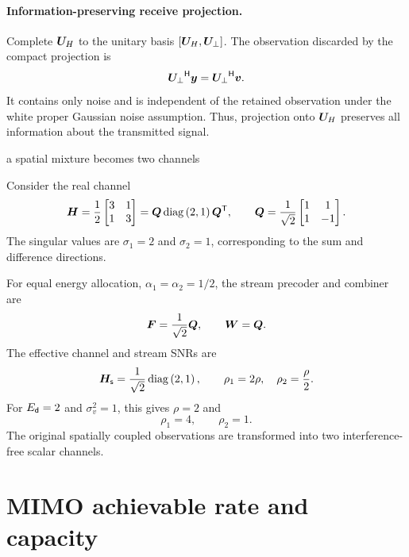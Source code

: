 \paragraph{Information-preserving receive projection.}
Complete $\bm{U}_{H}$ to the unitary basis
$[\bm{U}_{H},\bm{U}_{\perp}]$.
The observation discarded by the compact projection is
\begin{equation*}
	{\bm{U}_{\perp}}^{\mathsf{H}}\bm{y}
	={\bm{U}_{\perp}}^{\mathsf{H}}\bm{v}.
\end{equation*}
It contains only noise and is independent of the
retained observation under the white proper
Gaussian noise assumption. Thus, projection onto
$\bm{U}_{H}$ preserves all information about
the transmitted signal.

\begin{example}{a spatial mixture becomes two channels}
	\label{ex:svd}
	
	Consider the real channel
	\begin{equation*}
		\bm{H}
		=\frac{1}{2}
		\begin{bmatrix}
			3&1\\
			1&3
		\end{bmatrix}
		=\bm{Q}\operatorname{diag}\left(2,1\right){\bm{Q}}^{\mathsf{T}},
		\qquad
		\bm{Q}
		=\frac{1}{\sqrt{2}}
		\begin{bmatrix}
			1&1\\
			1&-1
		\end{bmatrix}.
	\end{equation*}
	The singular values are $\sigma_1=2$ and
	$\sigma_2=1$, corresponding to the sum and
	difference directions.
	
	For equal energy allocation,
	$\alpha_1=\alpha_2=1/2$, the stream precoder
	and combiner are
	\begin{equation*}
		\bm{F}=\frac{1}{\sqrt{2}}\bm{Q},
		\qquad
		\bm{W}=\bm{Q}.
	\end{equation*}
	The effective channel and stream SNRs are
	\begin{equation*}
		\bm{H}_{\mathsf{s}}
		=\frac{1}{\sqrt{2}}\operatorname{diag}\left(2,1\right),
		\qquad
		\rho_1=2\rho,\quad
		\rho_2=\frac{\rho}{2}.
	\end{equation*}
	For $E_{\mathsf{d}}=2$ and $\sigma_v^2=1$, this gives
	$\rho=2$ and
	\begin{equation*}
		\boxed{\rho_1=4,\qquad\rho_2=1.}
	\end{equation*}
	The original spatially coupled observations
	are transformed into two interference-free
	scalar channels.
\end{example}

\section{MIMO achievable rate and capacity}\label{sec:capacity}

